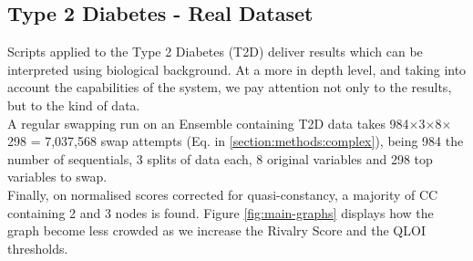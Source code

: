 \subsection{Type 2 Diabetes - Real Dataset}
Scripts applied to the Type 2 Diabetes (T2D) deliver results which can be interpreted using biological background. At a more in depth level, and taking into account the capabilities of the system, we pay attention not only to the results, but to the kind of data.
\\

A regular swapping run on an Ensemble containing T2D data takes 984$\times$3$\times$8$\times$298 = 7,037,568 swap attempts (Eq. in \ref{section:methods:complex}), being 984 the number of sequentials, 3 splits of data each, 8 original variables and 298 top variables to swap.
\\

Finally, on normalised scores corrected for quasi-constancy, a majority of CC containing 2 and 3 nodes is found. Figure \ref{fig:main-graphs} displays how the graph become less crowded as we increase the Rivalry Score and the QLOI thresholds.
\\

